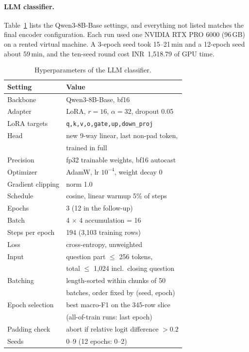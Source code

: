 \paragraph{LLM classifier.}
Table~\ref{tab:app-llm-hparams} lists the Qwen3-8B-Base settings, and everything not listed matches the final encoder configuration.
Each run used one NVIDIA RTX PRO 6000 (96\,GB) on a rented virtual machine.
A 3-epoch seed took 15--21\,min and a 12-epoch seed about 59\,min, and the ten-seed round cost INR~1,518.79 of GPU time.

\begin{table}[h]
\centering
\small
\begin{tabular}{@{}ll@{}}
\toprule
Setting & Value \\
\midrule
Backbone & Qwen3-8B-Base, bf16 \\
Adapter & LoRA, $r=16$, $\alpha=32$, dropout 0.05 \\
LoRA targets & \texttt{q,k,v,o,gate,up,down\_proj} \\
Head & new 9-way linear, last non-pad token, \\
     & trained in full \\
Precision & fp32 trainable weights, bf16 autocast \\
Optimizer & AdamW, lr $10^{-4}$, weight decay 0 \\
Gradient clipping & norm 1.0 \\
Schedule & cosine, linear warmup 5\% of steps \\
Epochs & 3 (12 in the follow-up) \\
Batch & 4 $\times$ 4 accumulation = 16 \\
Steps per epoch & 194 (3,103 training rows) \\
Loss & cross-entropy, unweighted \\
Input & question part $\le$ 256 tokens, \\
      & total $\le$ 1,024 incl.\ closing question \\
Batching & length-sorted within chunks of 50 \\
         & batches, order fixed by (seed, epoch) \\
Epoch selection & best macro-F1 on the 345-row slice \\
                & (all-of-train runs: last epoch) \\
Padding check & abort if relative logit difference $>0.2$ \\
Seeds & 0--9 (12 epochs: 0--2) \\
\bottomrule
\end{tabular}
\caption{Hyperparameters of the LLM classifier.}
\label{tab:app-llm-hparams}
\end{table}

